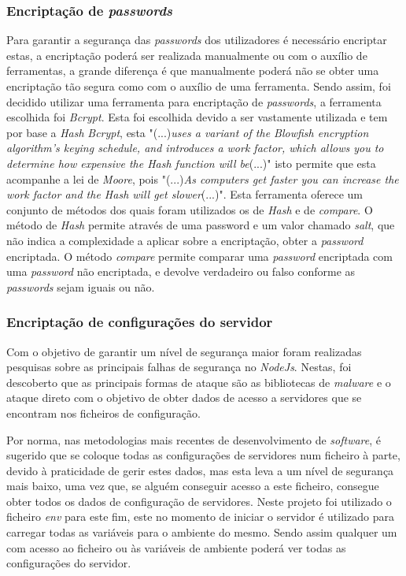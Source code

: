 \subsubsection{Encriptação de \textit{passwords}}
Para garantir a segurança das \textit{passwords} dos utilizadores é necessário encriptar estas, a encriptação poderá ser realizada manualmente ou com o auxílio de ferramentas, a grande diferença é que manualmente poderá não se obter uma encriptação tão segura como com o auxílio de uma ferramenta. Sendo assim, foi decidido utilizar uma ferramenta para encriptação de \textit{passwords}, a ferramenta escolhida foi \textit{Bcrypt}. Esta foi escolhida devido a ser vastamente utilizada e tem por base a \emph{Hash} \textit{Bcrypt}, esta "(...)\emph{uses a variant of the Blowfish encryption algorithm’s keying schedule, and introduces a work factor, which allows you to determine how expensive the Hash function will be}(...)"\citep{Bcrypt} isto permite que esta acompanhe a lei de \emph{Moore}, pois "(...)\emph{As computers get faster you can increase the work factor and the Hash will get slower}(...)"\citep{Bcrypt}. Esta ferramenta oferece um conjunto de métodos dos quais foram utilizados os de \emph{Hash} e de \emph{compare}. O método de \emph{Hash} permite através de uma password e um valor chamado \textit{salt}, que não indica a complexidade a aplicar sobre a encriptação, obter a \textit{password} encriptada. O método \emph{compare} permite comparar uma \textit{password} encriptada com uma \textit{password} não encriptada, e devolve verdadeiro ou falso conforme as \textit{passwords} sejam iguais ou não.

\newpage
\subsubsection{Encriptação de configurações do servidor}
Com o objetivo de garantir um nível de segurança maior foram realizadas pesquisas sobre as principais falhas de segurança no \textit{NodeJs}. Nestas, foi descoberto que as principais formas de ataque são as bibliotecas de \textit{malware} e o ataque direto com o objetivo de obter dados de acesso a servidores que se encontram nos ficheiros de configuração.

Por norma, nas metodologias mais recentes de desenvolvimento de \emph{software}, é sugerido que se coloque todas as configurações de servidores num ficheiro à parte, devido à praticidade de gerir estes dados, mas esta leva a um nível de segurança mais baixo, uma vez que, se alguém conseguir acesso a este ficheiro, consegue obter todos os dados de configuração de servidores. Neste projeto foi utilizado o ficheiro \textit{env} para este fim, este no momento de iniciar o servidor é utilizado para carregar todas as variáveis para o ambiente do mesmo. Sendo assim qualquer um com acesso ao ficheiro ou às variáveis de ambiente poderá ver todas as configurações do servidor.

